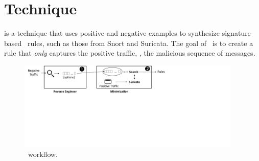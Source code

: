 \documentclass[runningheads]{llncs}
\begin{document}

\section{Technique}

\tname{} is a technique that uses positive and negative examples to
synthesize signature-based \nids\ rules, such as those from Snort and
Suricata. The goal of \tname\ is to create a rule that \emph{only}
captures the positive traffic, \ie{}, the malicious sequence of
messages.

\begin{figure}[t]
\centering
\includegraphics[trim=0 300 350 0,clip,width=0.95\textwidth]{figs/nids-workflow}
\caption{\tname\ workflow.}
\label{fig:overview}
\end{figure}
\end{document}
